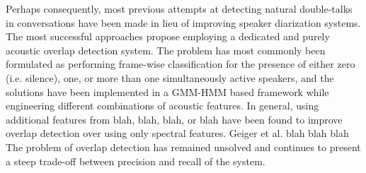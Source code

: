 \documentclass[a4paper]{article}
\begin{document}
Perhaps consequently, most previous attempts at detecting natural double-talks in conversations have been made in lieu of improving speaker diarization systems.
The most successful approaches propose employing a dedicated and purely acoustic overlap detection system.
The problem has most commonly been formulated as performing frame-wise classification for the presence of either
zero (i.e. silence), one, or more than one simultaneously active speakers,
and the solutions have been implemented in a GMM-HMM based framework while engineering different combinations of acoustic features.  %
In general, using additional features from blah, blah, blah, or blah %
have been found to improve overlap detection over using only spectral features.
Geiger et al. blah blah blah  %
The problem of overlap detection has remained unsolved
and continues to present a steep trade-off between precision and recall of the system.
\end{document}
